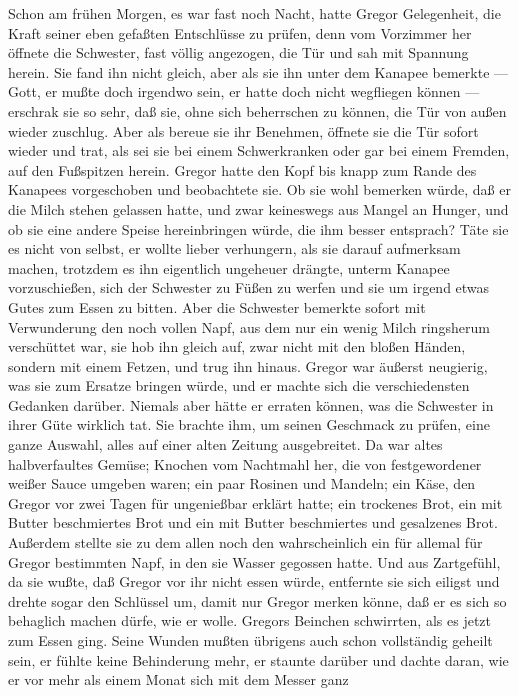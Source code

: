 Schon am frühen Morgen, es war fast noch Nacht, hatte Gregor
Gelegenheit, die Kraft seiner eben gefaßten Entschlüsse zu prüfen, denn
vom Vorzimmer her öffnete die Schwester, fast völlig angezogen, die Tür
und sah mit Spannung herein. Sie fand ihn nicht gleich, aber als sie ihn
unter dem Kanapee bemerkte --- Gott, er mußte doch irgendwo sein, er
hatte doch nicht wegfliegen können --- erschrak sie so sehr, daß sie,
ohne sich beherrschen zu können, die Tür von außen wieder zuschlug. Aber
als bereue sie ihr Benehmen, öffnete sie die Tür sofort wieder und trat,
als sei sie bei einem Schwerkranken oder gar bei einem Fremden, auf den
Fußspitzen herein. Gregor hatte den Kopf bis knapp zum Rande des
Kanapees vorgeschoben und beobachtete sie. Ob sie wohl bemerken würde,
daß er die Milch stehen gelassen hatte, und zwar keineswegs aus Mangel
an Hunger, und ob sie eine andere Speise hereinbringen würde, die ihm
besser entsprach? Täte sie es nicht von selbst, er wollte lieber
verhungern, als sie darauf aufmerksam machen, trotzdem es ihn eigentlich
ungeheuer drängte, unterm Kanapee vorzuschießen, sich der Schwester zu
Füßen zu werfen und sie um irgend etwas Gutes zum Essen zu bitten. Aber
die Schwester bemerkte sofort mit Verwunderung den noch vollen Napf, aus
dem nur ein wenig Milch ringsherum verschüttet war, sie hob ihn gleich
auf, zwar nicht mit den bloßen Händen, sondern mit einem Fetzen, und
trug ihn hinaus. Gregor war äußerst neugierig, was sie zum Ersatze
bringen würde, und er machte sich die verschiedensten Gedanken darüber.
Niemals aber hätte er erraten können, was die Schwester in ihrer Güte
wirklich tat. Sie brachte ihm, um seinen Geschmack zu prüfen, eine ganze
Auswahl, alles auf einer alten Zeitung ausgebreitet. Da war altes
halbverfaultes Gemüse; Knochen vom Nachtmahl her, die von festgewordener
weißer Sauce umgeben waren; ein paar Rosinen und Mandeln; ein Käse, den
Gregor vor zwei Tagen für ungenießbar erklärt hatte; ein trockenes Brot,
ein mit Butter beschmiertes Brot und ein mit Butter beschmiertes und
gesalzenes Brot. Außerdem stellte sie zu dem allen noch den
wahrscheinlich ein für allemal für Gregor bestimmten Napf, in den sie
Wasser gegossen hatte. Und aus Zartgefühl, da sie wußte, daß Gregor vor
ihr nicht essen würde, entfernte sie sich eiligst und drehte sogar den
Schlüssel um, damit nur Gregor merken könne, daß er es sich so behaglich
machen dürfe, wie er wolle. Gregors Beinchen schwirrten, als es jetzt
zum Essen ging. Seine Wunden mußten übrigens auch schon vollständig
geheilt sein, er fühlte keine Behinderung mehr, er staunte darüber und
dachte daran, wie er vor mehr als einem Monat sich mit dem Messer ganz
